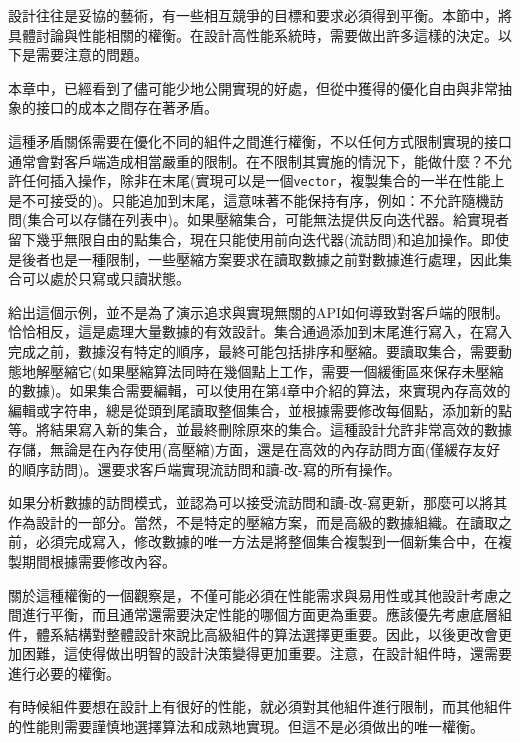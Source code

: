 
設計往往是妥協的藝術，有一些相互競爭的目標和要求必須得到平衡。本節中，將具體討論與性能相關的權衡。在設計高性能系統時，需要做出許多這樣的決定。以下是需要注意的問題。


本章中，已經看到了儘可能少地公開實現的好處，但從中獲得的優化自由與非常抽象的接口的成本之間存在著矛盾。 

這種矛盾關係需要在優化不同的組件之間進行權衡，不以任何方式限制實現的接口通常會對客戶端造成相當嚴重的限制。在不限制其實施的情況下，能做什麼？不允許任何插入操作，除非在末尾(實現可以是一個\texttt{vector}，複製集合的一半在性能上是不可接受的)。只能追加到末尾，這意味著不能保持有序，例如：不允許隨機訪問(集合可以存儲在列表中)。如果壓縮集合，可能無法提供反向迭代器。給實現者留下幾乎無限自由的點集合，現在只能使用前向迭代器(流訪問)和追加操作。即使是後者也是一種限制，一些壓縮方案要求在讀取數據之前對數據進行處理，因此集合可以處於只寫或只讀狀態。

給出這個示例，並不是為了演示追求與實現無關的API如何導致對客戶端的限制。恰恰相反，這是處理大量數據的有效設計。集合通過添加到末尾進行寫入，在寫入完成之前，數據沒有特定的順序，最終可能包括排序和壓縮。要讀取集合，需要動態地解壓縮它(如果壓縮算法同時在幾個點上工作，需要一個緩衝區來保存未壓縮的數據)。如果集合需要編輯，可以使用在第4章中介紹的算法，來實現內存高效的編輯或字符串，總是從頭到尾讀取整個集合，並根據需要修改每個點，添加新的點等。將結果寫入新的集合，並最終刪除原來的集合。這種設計允許非常高效的數據存儲，無論是在內存使用(高壓縮)方面，還是在高效的內存訪問方面(僅緩存友好的順序訪問)。還要求客戶端實現流訪問和讀-改-寫的所有操作。 

如果分析數據的訪問模式，並認為可以接受流訪問和讀-改-寫更新，那麼可以將其作為設計的一部分。當然，不是特定的壓縮方案，而是高級的數據組織。在讀取之前，必須完成寫入，修改數據的唯一方法是將整個集合複製到一個新集合中，在複製期間根據需要修改內容。 

關於這種權衡的一個觀察是，不僅可能必須在性能需求與易用性或其他設計考慮之間進行平衡，而且通常還需要決定性能的哪個方面更為重要。應該優先考慮底層組件，體系結構對整體設計來說比高級組件的算法選擇更重要。因此，以後更改會更加困難，這使得做出明智的設計決策變得更加重要。注意，在設計組件時，還需要進行必要的權衡。 


有時候組件要想在設計上有很好的性能，就必須對其他組件進行限制，而其他組件的性能則需要謹慎地選擇算法和成熟地實現。但這不是必須做出的唯一權衡。 

